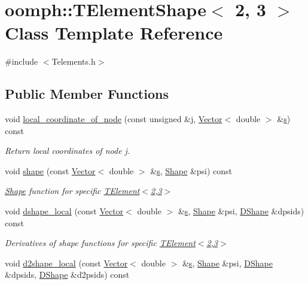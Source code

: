 \hypertarget{classoomph_1_1TElementShape_3_012_00_013_01_4}{}\section{oomph\+:\+:T\+Element\+Shape$<$ 2, 3 $>$ Class Template Reference}
\label{classoomph_1_1TElementShape_3_012_00_013_01_4}


{\ttfamily \#include $<$Telements.\+h$>$}

\subsection*{Public Member Functions}
\begin{DoxyCompactItemize}
\item 
void \hyperlink{classoomph_1_1TElementShape_3_012_00_013_01_4_a8771d894c753dc0d0e2dbc6ff084d460}{local\+\_\+coordinate\+\_\+of\+\_\+node} (const unsigned \&j, \hyperlink{classoomph_1_1Vector}{Vector}$<$ double $>$ \&\hyperlink{cfortran_8h_ab7123126e4885ef647dd9c6e3807a21c}{s}) const
\begin{DoxyCompactList}\small\item\em Return local coordinates of node j. \end{DoxyCompactList}\item 
void \hyperlink{classoomph_1_1TElementShape_3_012_00_013_01_4_a896f737a87fc608d78fc050f5e73d668}{shape} (const \hyperlink{classoomph_1_1Vector}{Vector}$<$ double $>$ \&\hyperlink{cfortran_8h_ab7123126e4885ef647dd9c6e3807a21c}{s}, \hyperlink{classoomph_1_1Shape}{Shape} \&psi) const
\begin{DoxyCompactList}\small\item\em \hyperlink{classoomph_1_1Shape}{Shape} function for specific \hyperlink{classoomph_1_1TElement}{T\+Element$<$2,3$>$} \end{DoxyCompactList}\item 
void \hyperlink{classoomph_1_1TElementShape_3_012_00_013_01_4_ab4f9dead4907b15a0acaed5c7a920e0a}{dshape\+\_\+local} (const \hyperlink{classoomph_1_1Vector}{Vector}$<$ double $>$ \&\hyperlink{cfortran_8h_ab7123126e4885ef647dd9c6e3807a21c}{s}, \hyperlink{classoomph_1_1Shape}{Shape} \&psi, \hyperlink{classoomph_1_1DShape}{D\+Shape} \&dpsids) const
\begin{DoxyCompactList}\small\item\em Derivatives of shape functions for specific \hyperlink{classoomph_1_1TElement}{T\+Element$<$2,3$>$} \end{DoxyCompactList}\item 
void \hyperlink{classoomph_1_1TElementShape_3_012_00_013_01_4_ac44c82a63ade1b5784443d6cf7d72170}{d2shape\+\_\+local} (const \hyperlink{classoomph_1_1Vector}{Vector}$<$ double $>$ \&\hyperlink{cfortran_8h_ab7123126e4885ef647dd9c6e3807a21c}{s}, \hyperlink{classoomph_1_1Shape}{Shape} \&psi, \hyperlink{classoomph_1_1DShape}{D\+Shape} \&dpsids, \hyperlink{classoomph_1_1DShape}{D\+Shape} \&d2psids) const
\end{DoxyCompactItemize}


